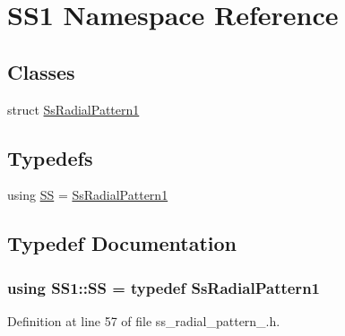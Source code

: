 \hypertarget{namespaceSS1}{}\section{S\+S1 Namespace Reference}
\label{namespaceSS1}
\subsection*{Classes}
\begin{DoxyCompactItemize}
\item 
struct \hyperlink{structSS1_1_1SsRadialPattern1}{Ss\+Radial\+Pattern1}
\end{DoxyCompactItemize}
\subsection*{Typedefs}
\begin{DoxyCompactItemize}
\item 
using \hyperlink{namespaceSS1_affb00a57f5ed1496226dd681f3d68840}{SS} = \hyperlink{structSS1_1_1SsRadialPattern1}{Ss\+Radial\+Pattern1}
\end{DoxyCompactItemize}


\subsection{Typedef Documentation}
\subsubsection[{\texorpdfstring{SS}{SS}}]{\setlength{\rightskip}{0pt plus 5cm}using {\bf S\+S1\+::\+SS} = typedef {\bf Ss\+Radial\+Pattern1}}\hypertarget{namespaceSS1_affb00a57f5ed1496226dd681f3d68840}{}\label{namespaceSS1_affb00a57f5ed1496226dd681f3d68840}


Definition at line 57 of file ss\+\_\+radial\+\_\+pattern\+\_.\+h.

